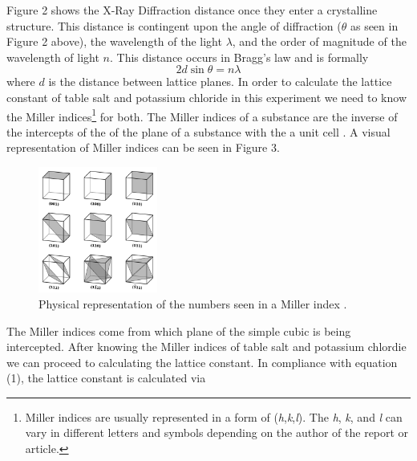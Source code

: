 \documentclass[twocolumn]{article}
\begin{document}
Figure 2 shows the X-Ray Diffraction distance once they enter a crystalline structure. This distance is contingent upon the angle of diffraction ($\theta$ as seen in Figure 2 above), the wavelength of the light $\lambda$, and the order of magnitude of the wavelength of light $n$. This distance occurs in Bragg's law and is formally
\begin{equation}\label{1}
2d\sin{\theta}=n\lambda
\end{equation}
where $d$ is the distance between lattice planes. In order to calculate the lattice constant of table salt and potassium chloride in this experiment we need to know the Miller indices\footnote{Miller indices are usually represented in a form of (\textit{h},\textit{k},\textit{l}). The \textit{h}, \textit{k}, and \textit{l} can vary in different letters and symbols depending on the author of the report or article.} for both. The Miller indices of a substance are the inverse of the intercepts of the of the plane of a substance with the a unit cell \cite{WikiCrystal}. A visual representation of Miller indices can be seen in Figure 3.
\begin{figure}[htbp]
\begin{center}
\includegraphics[width=0.35\textwidth]{Figures/PHYS 331 XRD Report Miller Indices.png}
\caption{Physical representation of the numbers seen in a Miller index \cite{WikiCrystal}.}
\label{Fig3}
\end{center}
\end{figure}
\newpage
The Miller indices come from which plane of the simple cubic is being intercepted. After knowing the Miller indices of table salt and potassium chlordie we can proceed to calculating the lattice constant. In compliance with equation (1), the lattice constant is calculated via
\end{document}
